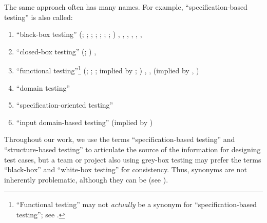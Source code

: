 The same approach often has many names. For example,
``specification-based testing'' is also called:
\begin{enumerate}
    \item ``black-box testing''
          \ifnotpaper
              (\citealp[p.~9]{IEEE2022}; \citeyear[p.~8]{IEEE2021};
              \citeyear[p.~431]{IEEE2017}; \citealp[p.~5\=/10]{SWEBOK2024};
              \citealpISTQB{}; \citealp[p.~46 (without hyphen)]{Firesmith2015};
              \citealp[p.~344]{SakamotoEtAl2013}; \citealp[p.~399]{vanVliet2000})
          \else
              \cite[p.~9]{IEEE2022}, \cite{ISTQB}, \cite[p.~431]{IEEE2017},
              \cite[p.~5\=/10]{SWEBOK2024}, \cite[p.~8]{IEEE2021},
              \cite[p.~399]{vanVliet2000},
              \cite[p.~344]{SakamotoEtAl2013}
          \fi
    \item ``closed-box testing''
          \ifnotpaper
              (\citealp[p.~9]{IEEE2022}; \citeyear[p.~431]{IEEE2017})
          \else
              \cite[p.~9]{IEEE2022}, \cite[p.~431]{IEEE2017}
          \fi
    \item ``functional testing''\footnote{``Functional testing'' may not
              \emph{actually} be a synonym for ``specification-based testing'';
              see .}
          \ifnotpaper
              (\citealp[p.~196]{IEEE2017}; \citealp[p.~44]{Kam2008};
              \citealp[p.~399]{vanVliet2000}; implied by
              \citealp[p.~129]{IEEE2021}; \citeyear[p.~431]{IEEE2017})
          \else
              \cite[p.~196]{IEEE2017}, \cite[p.~399]{vanVliet2000},
              \cite[p.~44]{Kam2008} (implied by \cite[p.~431]{IEEE2017},
              \cite[p.~129]{IEEE2021})
          \fi
    \item ``domain testing'' \citep[p.~5\=/10]{SWEBOK2024}
    \item ``specification-oriented testing'' \citep[p.~440, Fig.~12.2]{PetersAndPedrycz2000}
    \item ``input domain-based testing'' (implied by \citealp[pp.~4\=/7 to
              4\=/8]{SWEBOK2014})
\end{enumerate}
Throughout our work, we use the terms
``specification-based testing'' and ``structure-based testing'' to articulate
the source of the information for designing test cases, but a team or project
also using grey-box testing may prefer the terms ``black-box'' and ``white-box
testing'' for consistency. Thus, synonyms are not inherently problematic,
although they can be (see ).

